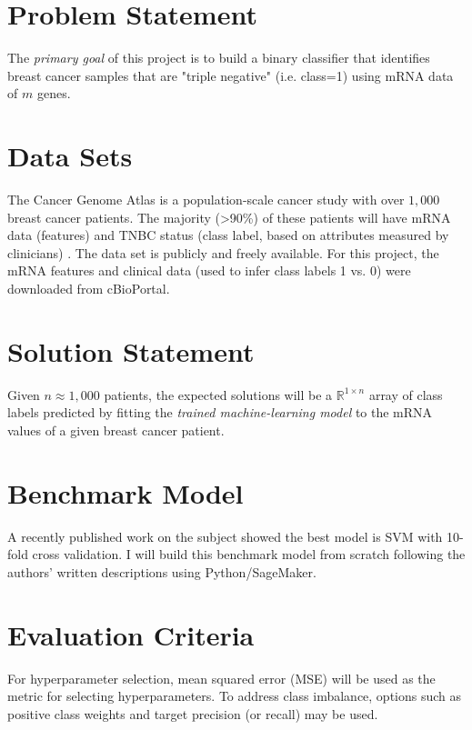 \documentclass[11pt]{diazessay}
\begin{document}
\section{Problem Statement}

The \textit{primary goal} of this project is to build a binary classifier that identifies breast cancer samples that are "triple negative" (i.e. class=1) using mRNA data of $m$ genes.

\section{Data Sets}

The Cancer Genome Atlas is a population-scale cancer study with  over $1,000$ breast cancer patients. The majority (>90\%) of these patients will have mRNA data (features) and TNBC status (class label, based on attributes measured by clinicians) \cite{tcga2012}. The data set is publicly and freely available. For this project, the mRNA features and clinical data (used to infer class labels 1 vs. 0)  were downloaded from cBioPortal.

\section{Solution Statement}

Given $n \approx 1,000$ patients, the expected solutions will be a $\mathbb{R}^{1 \times n}$ array of class labels predicted by fitting the \textit{trained machine-learning model} to the mRNA values of a given breast cancer patient.

\section{Benchmark Model}

A recently published work on the subject \cite{wu2021} showed the best model is SVM with 10-fold cross validation. I will build this benchmark model from scratch following the authors' written descriptions using Python/SageMaker.

\section{Evaluation Criteria}

For hyperparameter selection, mean squared error (MSE) will be used as the metric for selecting hyperparameters. To address class imbalance, options such as positive class weights and target precision (or recall) may be used. \\
\end{document}
